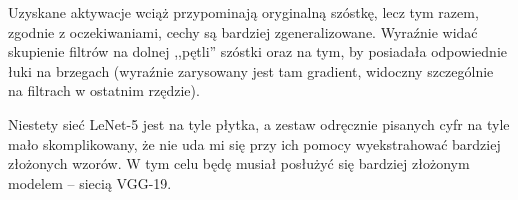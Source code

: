 Uzyskane aktywacje wciąż przypominają oryginalną szóstkę, lecz tym razem, zgodnie z oczekiwaniami, cechy są bardziej zgeneralizowane.
Wyraźnie widać skupienie filtrów na dolnej ,,pętli'' szóstki oraz na tym, by posiadała odpowiednie łuki na brzegach (wyraźnie zarysowany jest tam gradient, widoczny szczególnie na filtrach w ostatnim rzędzie).

Niestety sieć LeNet-5 jest na tyle płytka, a zestaw odręcznie pisanych cyfr na tyle mało skomplikowany, że nie uda mi się przy ich pomocy wyekstrahować bardziej złożonych wzorów. W tym celu będę musiał posłużyć się bardziej złożonym modelem -- siecią VGG-19. 
